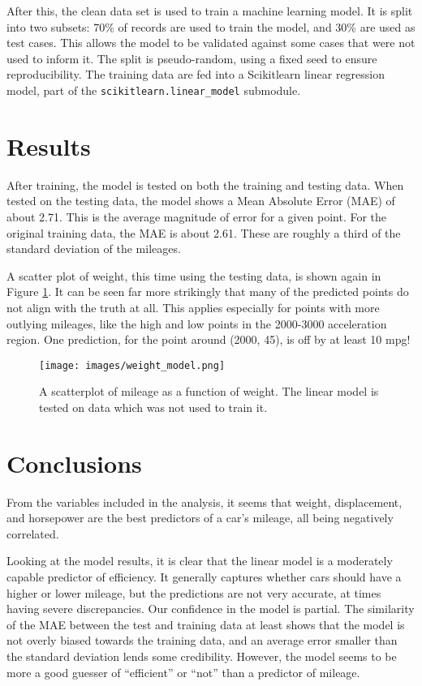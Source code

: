 \documentclass{article}
\begin{document}
After this, the clean data set is used to train a machine learning model. It is split into two subsets: 70\% of records are used to train the model, and 30\% are used as test cases. This allows the model to be validated against some cases that were not used to inform it. The split is pseudo-random, using a fixed seed to ensure reproducibility. The training data are fed into a Scikitlearn linear regression model, part of the \verb|scikitlearn.linear_model| submodule.

\section{Results}

After training, the model is tested on both the training and testing data. When tested on the testing data, the model shows a Mean Absolute Error (MAE) of about 2.71. This is the average magnitude of error for a given point. For the original training data, the MAE is about 2.61. These are roughly a third of the standard deviation of the mileages.

A scatter plot of weight, this time using the testing data, is shown again in Figure \ref{fig:weight_model}. It can be seen far more strikingly that many of the predicted points do not align with the truth at all. This applies especially for points with more outlying mileages, like the high and low points in the 2000-3000 acceleration region. One prediction, for the point around (2000, 45), is off by at least 10 mpg!

\begin{figure}[h!]
	\centering
	\texttt{[image: images/weight\_model.png]}
	\caption{A scatterplot of mileage as a function of weight. The linear model is tested on data which was not used to train it.}
	\label{fig:weight_model}
\end{figure}

\section{Conclusions}

From the variables included in the analysis, it seems that weight, displacement, and horsepower are the best predictors of a car's mileage, all being negatively correlated.

Looking at the model results, it is clear that the linear model is a moderately capable predictor of efficiency. It generally captures whether cars should have a higher or lower mileage, but the predictions are not very accurate, at times having severe discrepancies. Our confidence in the model is partial. The similarity of the MAE between the test and training data at least shows that the model is not overly biased towards the training data, and an average error smaller than the standard deviation lends some credibility. However, the model seems to be more a good guesser of ``efficient'' or ``not'' than a predictor of mileage.
\end{document}
